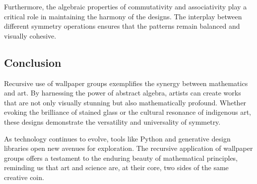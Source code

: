 Furthermore, the algebraic properties of commutativity and associativity play a critical role in maintaining the harmony of the designs. The interplay between different symmetry operations ensures that the patterns remain balanced and visually cohesive.

\subsection{Conclusion}
Recursive use of wallpaper groups exemplifies the synergy between mathematics and art. By harnessing the power of abstract algebra, artists can create works that are not only visually stunning but also mathematically profound. Whether evoking the brilliance of stained glass or the cultural resonance of indigenous art, these designs demonstrate the versatility and universality of symmetry.

As technology continues to evolve, tools like Python and generative design libraries open new avenues for exploration. The recursive application of wallpaper groups offers a testament to the enduring beauty of mathematical principles, reminding us that art and science are, at their core, two sides of the same creative coin.
